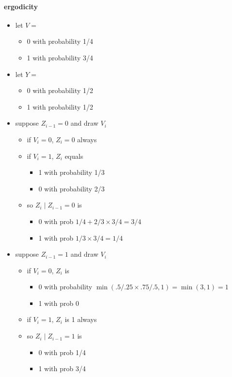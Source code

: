 \paragraph{ergodicity}
\begin{itemize}
\item let $V =$
\begin{itemize}
\item 0 with probability 1/4
\item 1 with probability 3/4
\end{itemize}
\item let $Y =$
\begin{itemize}
\item 0 with probability 1/2
\item 1 with probability 1/2
\end{itemize}
\item suppose $Z_{i-1} = 0$ and draw $V_i$
\begin{itemize}
\item if $V_i = 0$, $Z_i = 0$ always
\item if $V_i = 1$, $Z_i$ equals
\begin{itemize}
\item 1 with probability 1/3
\item 0 with probability 2/3
\end{itemize}
\item so $Z_i ∣ Z_{i-1} = 0$ is
\begin{itemize}
\item 0 with prob $1/4 + 2/3 × 3/4 = 3/4$
\item 1 with prob $1/3 × 3/4 = 1/4$
\end{itemize}
\end{itemize}
\item suppose $Z_{i-1} = 1$ and draw $V_i$
\begin{itemize}
\item if $V_i = 0$, $Z_i$ is
\begin{itemize}
\item 0 with probability $\min(.5/.25 × .75/.5, 1) =
            \min(3,1) = 1$
\item 1 with prob 0
\end{itemize}
\item if $V_i = 1$, $Z_i$ is 1 always
\item so $Z_i ∣ Z_{i-1} = 1$ is
\begin{itemize}
\item 0 with prob 1/4
\item 1 with prob 3/4

\end{itemize}
\end{itemize}
\end{itemize}
